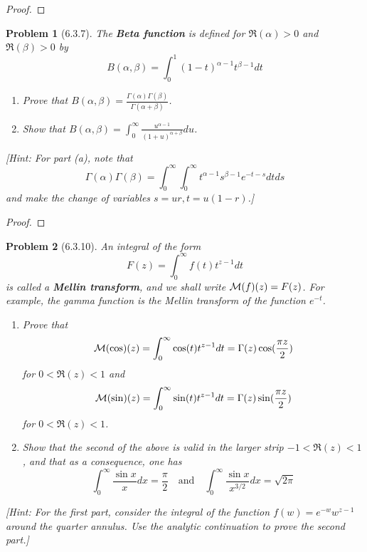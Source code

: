 \documentclass[10pt]{article}
\newcommand{\sk}{\vskip 10mm}
\theoremstyle{plain}
\newtheorem{problem}{Problem}
\theoremstyle{remark}
\begin{document}
\begin{proof}
  
\end{proof}

\sk

\begin{problem}[6.3.7]
  The \textbf{Beta function} is defined for $\Re(\alpha)>0$ and
  $\Re(\beta)>0$ by
  \[
    B(\alpha,\beta)=\int_0^1(1-t)^{\alpha-1}t^{\beta-1}dt
  \]
  \begin{enumerate}
  \item[(a)] Prove that
    $B(\alpha,\beta)=\frac{\Gamma(\alpha)\Gamma(\beta)}{\Gamma(\alpha+\beta)}$.
  \item[(b)] Show that
    $B(\alpha,\beta)=\int_0^\infty\frac{u^{\alpha-1}}{(1+u)^{\alpha+\beta}}du$.
  \end{enumerate}
  [Hint: For part (a), note that
  \[
    \Gamma(\alpha)\Gamma(\beta)=\int_0^\infty\int_0^\infty t^{\alpha-1}s^{\beta-1}e^{-t-s}dtds
  \]
  and make the change of variables $s=ur,t=u(1-r)$.]
\end{problem}

\begin{proof}
  
\end{proof}

\sk

\begin{problem}[6.3.10]
  An integral of the form
  \[
    F(z)=\int_0^\infty f(t)t^{z-1}dt
  \]
  is called a \textbf{Mellin transform}, and we shall write
  ${\cal M}(f)(z)=F(z)$. For example, the gamma function is the Mellin
  transform of the function $e^{-t}$.
  \begin{enumerate}
  \item[(a)] Prove that
    \[
      {\cal M}(\cos)(z)=\int_0^\infty\cos(t)t^{z-1}dt=\Gamma(z)\cos(\frac{\pi z}{2})
    \]
    for $0<\Re(z)<1$ and
    \[
      {\cal M}(\sin)(z)=\int_0^\infty\sin(t)t^{z-1}dt=\Gamma(z)\sin(\frac{\pi z}{2})
    \]
    for $0<\Re(z)<1$.
  \item[(b)] Show that the second of the above is valid in the larger strip
    $-1<\Re(z)<1$, and that as a consequence, one has
    \[
      \int_0^\infty \frac{\sin x}{x}dx=\frac{\pi}{2}\quad \text{and}\quad \int_0^\infty\frac{\sin x}{x^{3/2}}dx=\sqrt{2\pi}
    \]
  \end{enumerate}
  [Hint: For the first part, consider the integral of the function
  $f(w)=e^{-w}w^{z-1}$ around the quarter annulus. Use the analytic continuation
  to prove the second part.]
\end{problem}
\end{document}
